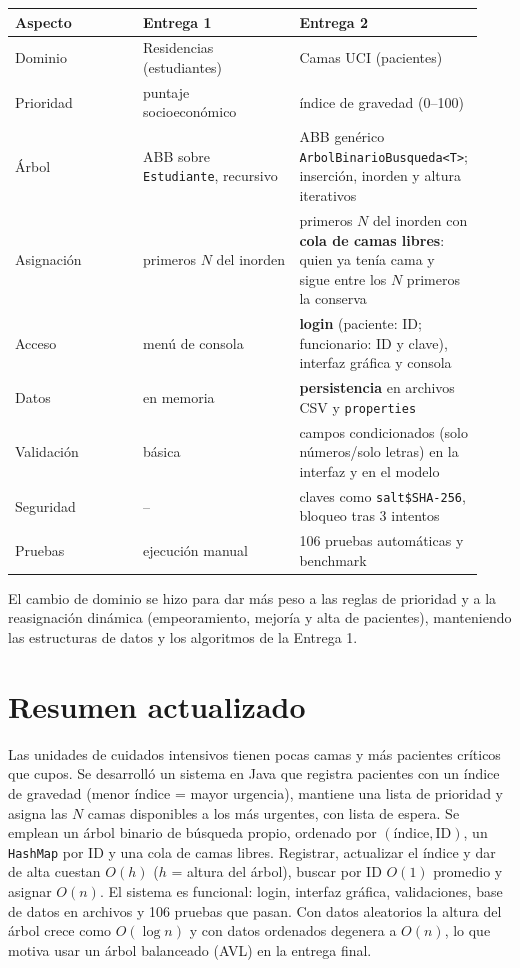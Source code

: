 \documentclass[11pt,a4paper]{article}
\begin{document}
\begin{longtable}{@{}p{0.27\linewidth}p{0.33\linewidth}p{0.33\linewidth}@{}}
\toprule \textbf{Aspecto} & \textbf{Entrega 1} & \textbf{Entrega 2}\\ \midrule \endhead
Dominio & Residencias (estudiantes) & Camas UCI (pacientes)\\
Prioridad & puntaje socioeconómico & índice de gravedad (0--100)\\
Árbol & ABB sobre \texttt{Estudiante}, recursivo & ABB genérico \texttt{ArbolBinarioBusqueda<T>}; inserción, inorden y altura iterativos\\
Asignación & primeros $N$ del inorden & primeros $N$ del inorden con \textbf{cola de camas libres}: quien ya tenía cama y sigue entre los $N$ primeros la conserva\\
Acceso & menú de consola & \textbf{login} (paciente: ID; funcionario: ID y clave), interfaz gráfica y consola\\
Datos & en memoria & \textbf{persistencia} en archivos CSV y \texttt{properties}\\
Validación & básica & campos condicionados (solo números/solo letras) en la interfaz y en el modelo\\
Seguridad & -- & claves como \texttt{salt\$SHA-256}, bloqueo tras 3 intentos\\
Pruebas & ejecución manual & 106 pruebas automáticas y benchmark\\
\bottomrule
\end{longtable}
El cambio de dominio se hizo para dar más peso a las reglas de prioridad y a la reasignación dinámica (empeoramiento, mejoría y alta de pacientes), manteniendo las estructuras de datos y los algoritmos de la Entrega 1.

\section{Resumen actualizado}
Las unidades de cuidados intensivos tienen pocas camas y más pacientes críticos que cupos. Se desarrolló un sistema en Java que registra pacientes con un índice de gravedad (menor índice = mayor urgencia), mantiene una lista de prioridad y asigna las $N$ camas disponibles a los más urgentes, con lista de espera. Se emplean un árbol binario de búsqueda propio, ordenado por $(\text{índice},\text{ID})$, un \texttt{HashMap} por ID y una cola de camas libres. Registrar, actualizar el índice y dar de alta cuestan $O(h)$ ($h$ = altura del árbol), buscar por ID $O(1)$ promedio y asignar $O(n)$. El sistema es funcional: login, interfaz gráfica, validaciones, base de datos en archivos y 106 pruebas que pasan. Con datos aleatorios la altura del árbol crece como $O(\log n)$ y con datos ordenados degenera a $O(n)$, lo que motiva usar un árbol balanceado (AVL) en la entrega final.
\end{document}
